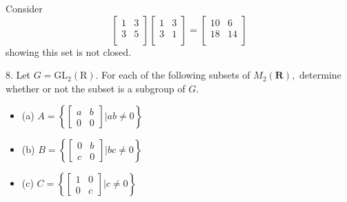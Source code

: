 \begin{mdframed}[style=darkAnswer,frametitle={Joe Starr}]
Consider $$\begin{bmatrix}
  1 & 3\\
  3 & 5\\
  \end{bmatrix}\begin{bmatrix}
  1 & 3\\
  3 & 1\\
  \end{bmatrix}=\begin{bmatrix}
  10 & 6\\
  18 & 14\\
  \end{bmatrix}$$ showing this set is not closed.
\end{mdframed}
\newpage
\begin{mdframed}[style=darkQuesion]
8. Let $G=\mathrm{GL}_{2}(\mathrm{R}) .$ For each of the following subsets of $M_{2}(\mathbf{R}),$ determine whether
or not the subset is a subgroup of $G .$
\begin{itemize}[align=left]

\item []{(a) $A=\left\{\left[\begin{array}{ll}a & b \\ 0 & 0\end{array}\right] | a b \neq 0\right\}$}
\item []{(b) $B=\left\{\left[\begin{array}{ll}0 & b \\ c & 0\end{array}\right] | b c \neq 0\right\}$}
\item []{(c) $C=\left\{\left[\begin{array}{ll}1 & 0 \\ 0 & c\end{array}\right] | c \neq 0\right\}$}

\end{itemize}
\end{mdframed}

